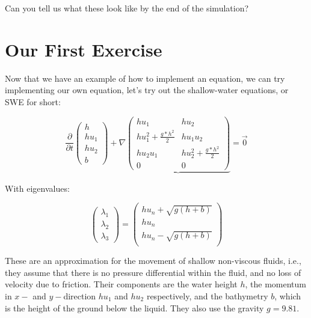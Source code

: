 \documentclass[12pt,letterpaper]{article}
\begin{document}
Can you tell us what these look like by the end of the simulation?

\section{Our First Exercise}
\vspace{0.2cm}

Now that we have an example of how to implement an equation,
we can try implementing our own equation, let's try out the shallow-water equations, or SWE for short:

\begin{equation*} \label{SWE_wo}
    \frac{\partial}{\partial t}\left(
    \begin{array}{lr} h \\
        h u_1 \\
        h u_2 \\
        b
        \end{array} \right) +
    \nabla \underbrace{\begin{pmatrix}
        h u_1                       & h u_2     \\
        h u_1^2 + \frac{g*h^2}{2}   & h u_1 u_2 \\
        h u_2 u_1                   & h u_2^2  + \frac{g*h^2}{2} \\
        0                           & 0
    \end{pmatrix}} = \vec{0}
\end{equation*}

With eigenvalues:

\begin{equation*}
    \left(
    \begin{array}{lr}
        \lambda_1 \\
        \lambda_2 \\
        \lambda_3
    \end{array} \right) =
    \left(
    \begin{array}{lr}
        h u_n + \sqrt{g (h+b)} \\
        h u_n \\
        h u_n - \sqrt{g (h+b)} \\
    \end{array} \right)
\end{equation*}

These are an approximation for the movement of shallow non-viscous fluids, i.e., they assume that there is no pressure
differential within the fluid, and no loss of velocity due to friction.
Their components are the water height $h$, the momentum in $x-$ and $y-$direction $hu_1$ and $hu_2$ respectively,
and the bathymetry $b$, which is the height of the ground below the liquid. They also use the gravity $g=9.81$.\\
\end{document}
